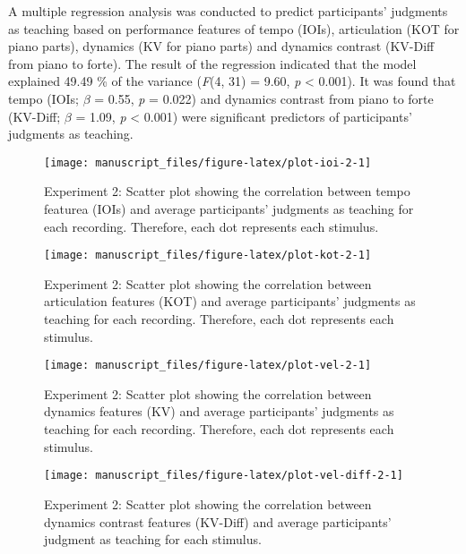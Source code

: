 \documentclass[
  man,floatsintext]{apa6}
\begin{document}
A multiple regression analysis was conducted to predict participants' judgments as teaching based on performance features of tempo (IOIs), articulation (KOT for piano parts), dynamics (KV for piano parts) and dynamics contrast (KV-Diff from piano to forte). The result of the regression indicated that the model explained 49.49 \% of the variance (\emph{F}(4, 31) = 9.60, \emph{p} \textless{} 0.001). It was found that tempo (IOIs; \emph{\(\beta\)} = 0.55, \emph{p} = 0.022) and dynamics contrast from piano to forte (KV-Diff; \emph{\(\beta\)} = 1.09, \emph{p} \textless{} 0.001) were significant predictors of participants' judgments as teaching.

\begin{figure}

{\centering \texttt{[image: manuscript\_files/figure-latex/plot-ioi-2-1]} 

}

\caption{\label{fig:ioi-2}Experiment 2: Scatter plot showing the correlation between tempo featurea (IOIs) and average participants' judgments as teaching for each recording. Therefore, each dot represents each stimulus.}\label{fig:plot-ioi-2}
\end{figure}

\begin{figure}

{\centering \texttt{[image: manuscript\_files/figure-latex/plot-kot-2-1]} 

}

\caption{\label{fig:kot-2}Experiment 2: Scatter plot showing the correlation between articulation features (KOT) and average participants' judgments as teaching for each recording. Therefore, each dot represents each stimulus.}\label{fig:plot-kot-2}
\end{figure}

\begin{figure}

{\centering \texttt{[image: manuscript\_files/figure-latex/plot-vel-2-1]} 

}

\caption{\label{fig:vel-2}Experiment 2: Scatter plot showing the correlation between dynamics features (KV) and average participants' judgments as teaching for each recording. Therefore, each dot represents each stimulus.}\label{fig:plot-vel-2}
\end{figure}

\begin{figure}

{\centering \texttt{[image: manuscript\_files/figure-latex/plot-vel-diff-2-1]} 

}

\caption{\label{fig:vel-diff-2}Experiment 2: Scatter plot showing the correlation between dynamics contrast features (KV-Diff) and average participants' judgment as teaching for each stimulus.}\label{fig:plot-vel-diff-2}
\end{figure}
\end{document}
